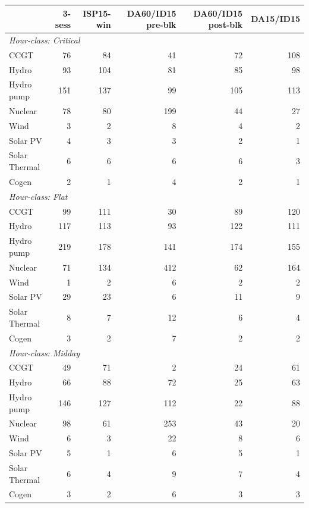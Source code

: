 \begin{tabular}{l r r r r r}
\toprule
 & 3-sess & ISP15-win & DA60/ID15 pre-blk & DA60/ID15 post-blk & DA15/ID15 \\
\midrule
\multicolumn{6}{l}{\textit{Hour-class: Critical}} \\
CCGT & 76 & 84 & 41 & 72 & 108 \\
Hydro & 93 & 104 & 81 & 85 & 98 \\
Hydro pump & 151 & 137 & 99 & 105 & 113 \\
Nuclear & 78 & 80 & 199 & 44 & 27 \\
Wind & 3 & 2 & 8 & 4 & 2 \\
Solar PV & 4 & 3 & 3 & 2 & 1 \\
Solar Thermal & 6 & 6 & 6 & 6 & 3 \\
Cogen & 2 & 1 & 4 & 2 & 1 \\
\midrule
\multicolumn{6}{l}{\textit{Hour-class: Flat}} \\
CCGT & 99 & 111 & 30 & 89 & 120 \\
Hydro & 117 & 113 & 93 & 122 & 111 \\
Hydro pump & 219 & 178 & 141 & 174 & 155 \\
Nuclear & 71 & 134 & 412 & 62 & 164 \\
Wind & 1 & 2 & 6 & 2 & 2 \\
Solar PV & 29 & 23 & 6 & 11 & 9 \\
Solar Thermal & 8 & 7 & 12 & 6 & 4 \\
Cogen & 3 & 2 & 7 & 2 & 2 \\
\midrule
\multicolumn{6}{l}{\textit{Hour-class: Midday}} \\
CCGT & 49 & 71 & 2 & 24 & 61 \\
Hydro & 66 & 88 & 72 & 25 & 63 \\
Hydro pump & 146 & 127 & 112 & 22 & 88 \\
Nuclear & 98 & 61 & 253 & 43 & 20 \\
Wind & 6 & 3 & 22 & 8 & 6 \\
Solar PV & 5 & 1 & 6 & 5 & 1 \\
Solar Thermal & 6 & 4 & 9 & 7 & 4 \\
Cogen & 3 & 2 & 6 & 3 & 3 \\
\midrule
\bottomrule
\end{tabular}
